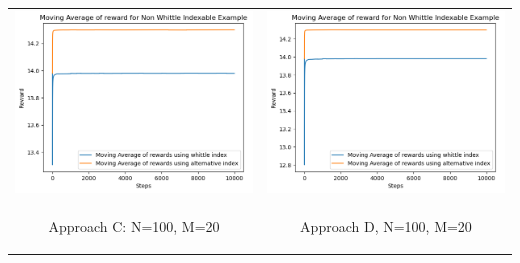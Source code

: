 \documentclass{slides}
\begin{document}
{{\begin{center}
\begin{tabular}{cc}
\includegraphics[scale=0.6]{non_whittle_comparison_C.png} &
\includegraphics[scale=0.6]{non_whittle_comparison_D.png} \\
\begin{small}
 Approach C: N=100, M=20\end{small} & \begin{small}Approach D, N=100, M=20\end{small}\\
 \end{tabular}


\end{center}}}
\end{document}
